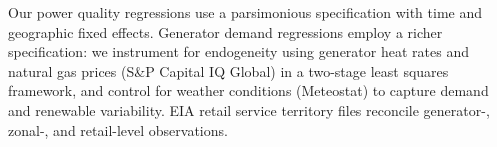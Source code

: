 \documentclass[a4paper,fleqn,longmktitle]{cas-sc}
\theoremstyle{plain}
\theoremstyle{definition}
\begin{document}
Our power quality regressions use a parsimonious specification with time and geographic fixed effects. Generator demand regressions employ a richer specification: we instrument for endogeneity using generator heat rates and natural gas prices (S\&P Capital IQ Global) in a two-stage least squares framework, and control for weather conditions (Meteostat) to capture demand and renewable variability. EIA retail service territory files reconcile generator-, zonal-, and retail-level observations.
\end{document}
